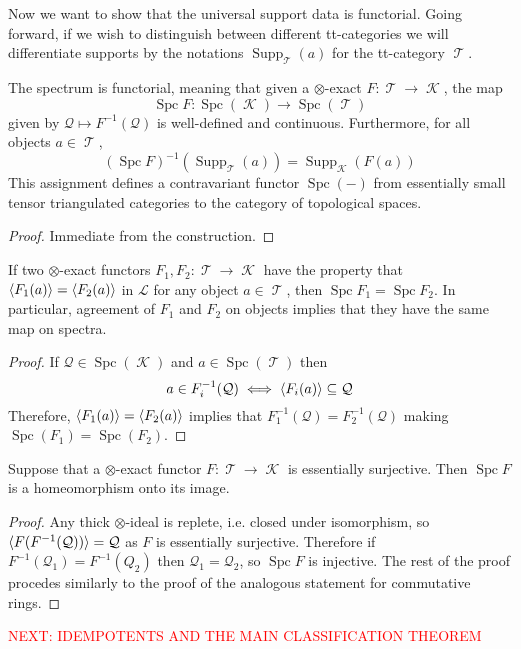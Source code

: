 \documentclass[11pt]{article}
\DeclareMathOperator{\CK}{\mathcal{K}}
\DeclareMathOperator{\TT}{\mathcal{T}}
\DeclareMathOperator{\supp}{Supp}
\DeclareMathOperator{\spc}{Spc}
\begin{document}
Now we want to show that the universal support data is functorial. Going forward, if we wish to distinguish between different tt-categories we will differentiate supports by the notations $\supp_{\TT}(a)$ for the tt-category $\TT$.

\begin{prop}
The spectrum is functorial, meaning that given a $\otimes$-exact $F: \TT \to \CK$, the map 
\[
	\spc F: \spc(\CK) \to \spc(\TT)
\]
given by $\mathcal{Q} \mapsto F^{-1}(\mathcal{Q})$ is well-defined and continuous. Furthermore, for all objects $a \in \TT$, 
\[
	(\spc F)^{-1}(\supp_{\TT}(a)) = \supp_{\CK}(F(a))
\]
This assignment defines a contravariant functor $\spc(-)$ from essentially small tensor triangulated categories to the category of topological spaces.
\end{prop}
\begin{proof}
Immediate from the construction.
\end{proof}

\begin{cor}
If two $\otimes$-exact functors $F_1,F_2: \TT \to \CK$ have the property that $\langle F_1(a) \rangle = \langle F_2(a) \rangle$ in $\mathcal{L}$ for any object $a \in \TT$, then $\spc F_1 = \spc F_2$. In particular, agreement of $F_1$ and $F_2$ on objects implies that they have the same map on spectra.
\end{cor}
\begin{proof}
If $\mathcal{Q} \in \spc(\CK)$ and $a \in \spc(\TT)$ then
\[
	a \in F_i^{-1}(\mathcal{Q}) \iff \langle F_i(a) \rangle \subseteq \mathcal{Q}
\]
Therefore, $\langle F_1(a) \rangle = \langle F_2(a) \rangle$ implies that $F_1^{-1}(\mathcal{Q}) = F_2^{-1}(\mathcal{Q})$ making $\spc(F_1) = \spc(F_2)$.
\end{proof}

\begin{cor}
Suppose that a $\otimes$-exact functor $F: \TT \to \CK$ is essentially surjective. Then $\spc F$ is a homeomorphism onto its image.
\end{cor}
\begin{proof}
Any thick $\otimes$-ideal is replete, i.e. closed under isomorphism, so $\langle F(F^{-1}(\mathcal{Q})) \rangle = \mathcal{Q}$ as $F$ is essentially surjective. Therefore if $F^{-1}(\mathcal{Q}_1) = F^{-1}(Q_{2})$ then $\mathcal{Q}_1 = \mathcal{Q}_2$, so $\spc F$ is injective. The rest of the proof procedes similarly to the proof of the analogous statement for commutative rings.
\end{proof}

\textcolor{red}{NEXT: IDEMPOTENTS AND THE MAIN CLASSIFICATION THEOREM}
\end{document}
